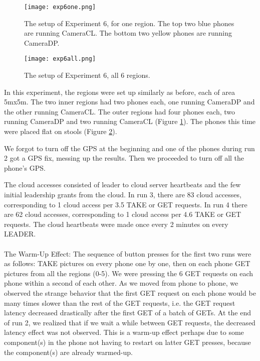 \begin{figure}[htb]
\begin{center}
\texttt{[image: exp6one.png]}
\caption{The setup of Experiment 6, for one region. The top two blue phones are running CameraCL. The bottom two yellow phones are running CameraDP.}
\label{fig:exp6one-png}
\end{center}
\end{figure}

\begin{figure}[htb]
\begin{center}
\texttt{[image: exp6all.png]}
\caption{The setup of Experiment 6, all 6 regions.}
\label{fig:exp6all-png}
\end{center}
\end{figure}

In this experiment, the regions were set up similarly as before, each of area 5mx5m. The two inner regions had two phones each, one running CameraDP and the other running CameraCL. The outer regions had four phones each, two running CameraDP and two running CameraCL (Figure \ref{fig:exp6one-png}). The phones this time were placed flat on stools (Figure \ref{fig:exp6all-png}).

We forgot to turn off the GPS at the beginning and one of the phones during run 2 got a GPS fix, messing up the results. Then we proceeded to turn off all the phone's GPS. 

The cloud accesses consisted of leader to cloud server heartbeats and the few initial leadership grants from the cloud. In run 3, there are 83 cloud accesses, corresponding to 1 cloud access per 3.5 TAKE or GET requests. In run 4 there are 62 cloud accesses, corresponding to 1 cloud access per 4.6 TAKE or GET requests. The cloud heartbeats were made once every 2 minutes on every LEADER.
\\
\\
The Warm-Up Effect:
The sequence of button presses for the first two runs were as follows: TAKE pictures on every phone one by one, then on each phone GET pictures from all the regions (0-5). We were pressing the 6 GET requests on each phone within a second of each other. As we moved from phone to phone, we observed the strange behavior that the first GET request on each phone would be many times slower than the rest of the GET requests, i.e. the GET request latency decreased drastically after the first GET of a batch of GETs. At the end of run 2, we realized that if we wait a while between GET requests, the decreased latency effect was not observed.  This is a warm-up effect perhaps due to some component(s) in the phone not having to restart on latter GET presses, because the component(s) are already warmed-up.

